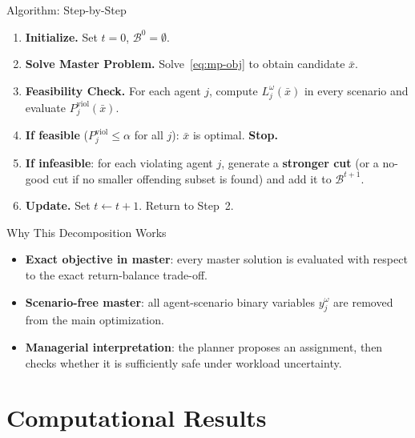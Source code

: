 \documentclass[aspectratio=169,11pt]{beamer}
\begin{document}
\begin{frame}{Algorithm: Step-by-Step}
	\begin{enumerate}
		\item<1-> \textbf{Initialize.} Set $t = 0$, $\mathcal{B}^0 = \emptyset$.
		\item<2-> \textbf{Solve Master Problem.}
			Solve~\eqref{eq:mp-obj} to obtain candidate $\bar{x}$.
		\item<3-> \textbf{Feasibility Check.}
			For each agent $j$, compute $L_j^\omega(\bar{x})$ in every scenario
			and evaluate $P_j^{\text{viol}}(\bar{x})$.
		\item<4-> \textbf{If feasible} ($P_j^{\text{viol}} \leq \alpha$ for all $j$):
			$\bar{x}$ is optimal. \textbf{Stop.}
		\item<5-> \textbf{If infeasible}: for each violating agent $j$,
			generate a \textbf{stronger cut} (or a no-good cut if no smaller
			offending subset is found) and add it to $\mathcal{B}^{t+1}$.
		\item<6-> \textbf{Update.} Set $t \leftarrow t + 1$. Return to Step~2.
	\end{enumerate}
\end{frame}

\begin{frame}{Why This Decomposition Works}
	\begin{itemize}
		\item<1-> \textbf{Exact objective in master}: every master solution is
			evaluated with respect to the exact return-balance trade-off.
		\item<2-> \textbf{Scenario-free master}: all agent-scenario binary variables
			$y_j^\omega$ are removed from the main optimization.
		\item<3-> \textbf{Managerial interpretation}: the planner proposes an
			assignment, then checks whether it is sufficiently safe under
			workload uncertainty.
	\end{itemize}
\end{frame}

\section{Computational Results}
\end{document}
